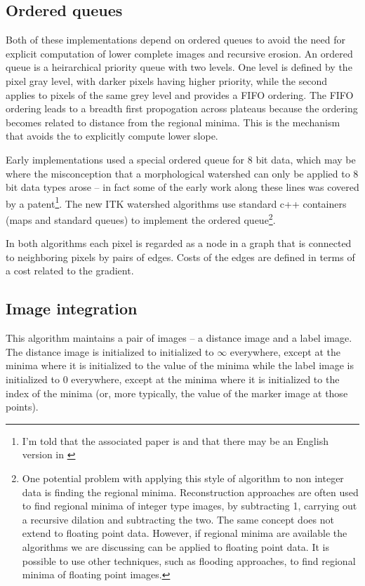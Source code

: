 \documentclass{InsightArticle}
\begin{document}
\subsection{Ordered queues}
Both of these implementations depend on ordered queues to avoid the
need for explicit computation of lower complete images and recursive
erosion. An ordered queue is a heirarchical priority queue with two
levels. One level is defined by the pixel gray level, with darker
pixels having higher priority, while the second applies to pixels of
the same grey level and provides a FIFO ordering. The FIFO ordering
leads to a breadth first propogation across plateaus because the
ordering becomes related to distance from the regional minima. This is
the mechanism that avoids the to explicitly compute lower slope.

Early implementations used a special ordered queue for 8 bit data,
which may be where the misconception that a morphological watershed
can only be applied to 8 bit data types arose -- in fact some of the
early work along these lines was covered by a patent\footnote{I'm told
that the associated paper is \cite{Meyer91a} and that there may be an
English version in \cite{Dougherty93a}}. The new ITK watershed
algorithms use standard c++ containers (maps and standard queues) to
implement the ordered queue\footnote{One potential problem with
applying this style of algorithm to non integer data is finding the
regional minima. Reconstruction approaches are often used to find
regional minima of integer type images, by subtracting 1, carrying out
a recursive dilation and subtracting the two. The same concept does
not extend to floating point data. However, if regional minima are
available the algorithms we are discussing can be applied to floating
point data. It is possible to use other techniques, such as flooding
approaches, to find regional minima of floating point images.}.

In both algorithms each pixel is regarded as a node in a graph that is
connected to neighboring pixels by pairs of edges. Costs of the edges
are defined in terms of a cost related to the gradient.

\subsection{Image integration}
This algorithm maintains a pair of images -- a distance image and a
label image. The distance image is initialized to initialized to
$\infty$ everywhere, except at the minima where it is initialized to
the value of the minima while the label image is initialized to $0$
everywhere, except at the minima where it is initialized to the index
of the minima (or, more typically, the value of the marker image at
those points).
\end{document}
